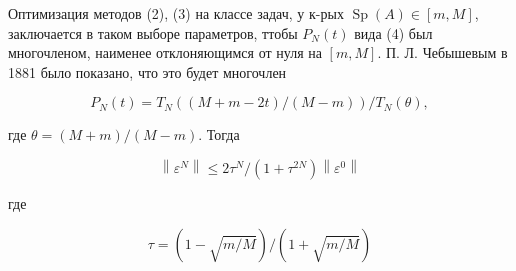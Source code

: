 \documentclass[10pt]{article}
\begin{document}
Оптимизация методов (2), (3) на классе задач, у к-рых $\operatorname{Sp}(A) \in[m, M]$, заключается в таком выборе параметров, ттобы $P_{N}(t)$ вида (4) был многочленом, наименее отклоняющимся от нуля на $[m, M]$. П. Л. Чебышевым в 1881 было показано, что это будет многочлен



\[

P_{N}(t)=T_{N}((M+m-2 t) /(M-m)) / T_{N}(\theta),

\]



где $\theta=(M+m) /(M-m)$. Тогда



\[

\left\|\varepsilon^{N}\right\| \leqslant 2 \tau^{N} /\left(1+\tau^{2 N}\right)\left\|\varepsilon^{0}\right\|

\]



где



\[

\tau=(1-\sqrt{m / M}) /(1+\sqrt{m / M})

\]
\end{document}

